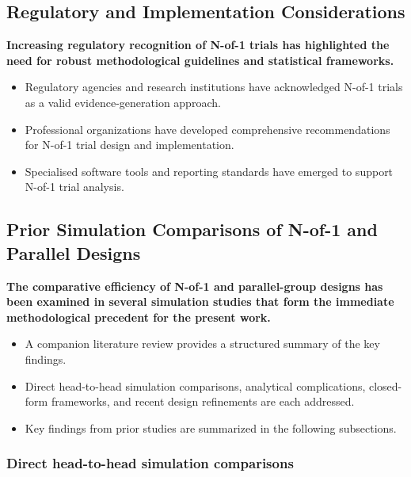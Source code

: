 \documentclass[
  11pt,
]{article}
\begin{document}
\subsection{Regulatory and Implementation Considerations}\label{regulatory-and-implementation-considerations}

\textbf{Increasing regulatory recognition of N-of-1 trials has highlighted the need for robust methodological guidelines and statistical frameworks.}

\begin{itemize}\setlength{\itemsep}{2pt}\setlength{\parskip}{0pt}
\item Regulatory agencies and research institutions have acknowledged N-of-1 trials as a valid evidence-generation approach.
\item Professional organizations have developed comprehensive recommendations for N-of-1 trial design and implementation.
\item Specialised software tools and reporting standards have emerged to support N-of-1 trial analysis.
\end{itemize}

\subsection{Prior Simulation Comparisons of N-of-1 and Parallel Designs}\label{prior-simulation-comparisons-of-n-of-1-and-parallel-designs}

\textbf{The comparative efficiency of N-of-1 and parallel-group designs has been examined in several simulation studies that form the immediate methodological precedent for the present work.}

\begin{itemize}\setlength{\itemsep}{2pt}\setlength{\parskip}{0pt}
\item A companion literature review provides a structured summary of the key findings.
\item Direct head-to-head simulation comparisons, analytical complications, closed-form frameworks, and recent design refinements are each addressed.
\item Key findings from prior studies are summarized in the following subsections.
\end{itemize}

\subsubsection{Direct head-to-head simulation comparisons}\label{direct-head-to-head-simulation-comparisons}
\end{document}
